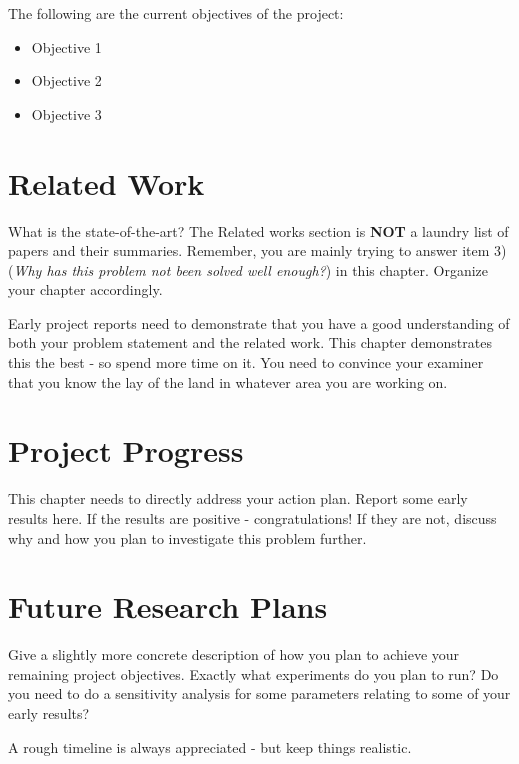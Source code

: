 \documentclass[hyp]{socreport}
\begin{document}
The following are the current objectives of the project: 
\begin{itemize}
    \item Objective 1
    \item Objective 2
    \item Objective 3
\end{itemize}

\clearpage

\chapter{Related Work}
\label{sec:related}

What is the state-of-the-art? The Related works section is \textbf{NOT} a laundry list of papers and their summaries. Remember, you are mainly trying to answer item 3) ({\em Why has this problem not been solved well enough?}) in this chapter. Organize your chapter accordingly. 

Early project reports need to demonstrate that you have a good understanding of both your problem statement and the related work. This chapter demonstrates this the best - so spend more time on it. You need to convince your examiner that you know the lay of the land in whatever area you are working on.

\chapter{Project Progress}
\label{sec:progress}

This chapter needs to directly address your action plan. Report some early results here. If the results are positive - congratulations! If they are not, discuss why and how you plan to investigate this problem further.



\chapter{Future Research Plans}
\label{sec:future}

Give a slightly more concrete description of how you plan to achieve your remaining project objectives. Exactly what experiments do you plan to run? Do you need to do a sensitivity analysis for some parameters relating to some of your early results? 

A rough timeline is always appreciated - but keep things realistic. 

\printbibliography
\end{document}
